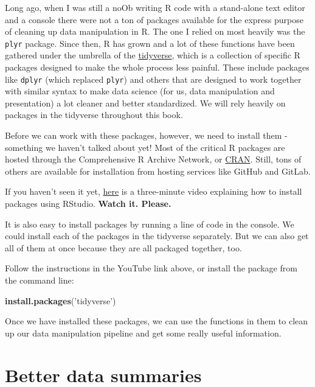 \documentclass[
]{book}
\newenvironment{Shaded}{\begin{snugshade}}{\end{snugshade}}
\newcommand{\KeywordTok}[1]{\textcolor[rgb]{0.13,0.29,0.53}{\textbf{#1}}}
\newcommand{\NormalTok}[1]{#1}
\newcommand{\StringTok}[1]{\textcolor[rgb]{0.31,0.60,0.02}{#1}}
\begin{document}
Long ago, when I was still a noOb writing R code with a stand-alone text editor and a console there were not a ton of packages available for the express purpose of cleaning up data manipulation in R. The one I relied on most heavily was the \texttt{plyr} package. Since then, R has grown and a lot of these functions have been gathered under the umbrella of the \href{https://www.tidyverse.org/packages/}{tidyverse}, which is a collection of specific R packages designed to make the whole process less painful. These include packages like \texttt{dplyr} (which replaced \texttt{plyr}) and others that are designed to work together with similar syntax to make data science (for us, data manipulation and presentation) a lot cleaner and better standardized. We will rely heavily on packages in the tidyverse throughout this book.

Before we can work with these packages, however, we need to install them - something we haven't talked about yet! Most of the critical R packages are hosted through the Comprehensive R Archive Network, or \href{https://cran.r-project.org/}{CRAN}. Still, tons of others are available for installation from hosting services like GitHub and GitLab.

If you haven't seen it yet, \href{https://www.youtube.com/watch?v=u1r5XTqrCTQ}{here} is a three-minute video explaining how to install packages using RStudio. \textbf{Watch it. Please.}

It is also easy to install packages by running a line of code in the console. We could install each of the packages in the tidyverse separately. But we can also get all of them at once because they are all packaged together, too.

Follow the instructions in the YouTube link above, or install the package from the command line:

\begin{Shaded}
\begin{Highlighting}[]
\KeywordTok{install.packages}\NormalTok{(}\StringTok{'tidyverse'}\NormalTok{)}
\end{Highlighting}
\end{Shaded}

Once we have installed these packages, we can use the functions in them to clean up our data manipulation pipeline and get some really useful information.

\hypertarget{better-data-summaries}{%
\section{Better data summaries}\label{better-data-summaries}}
\end{document}
